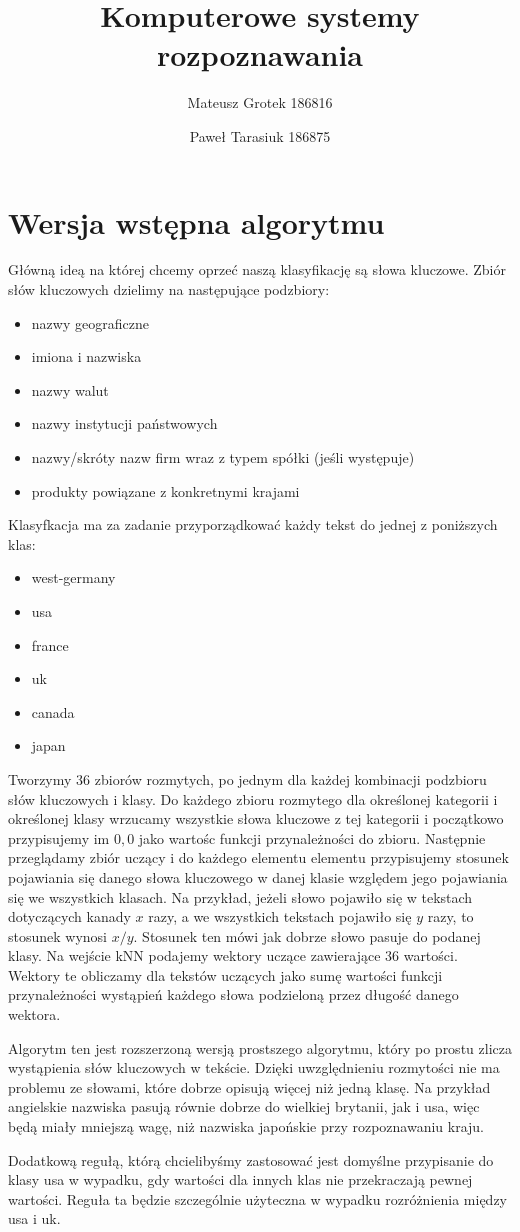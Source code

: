 \documentclass[a4paper]{article}
\title{Komputerowe systemy rozpoznawania}
\author{Mateusz Grotek 186816 \and Paweł Tarasiuk 186875}
\date{}
\begin{document}
\maketitle
\section{Wersja wstępna algorytmu}
Główną ideą na której chcemy oprzeć naszą klasyfikację są słowa kluczowe. Zbiór słów kluczowych dzielimy na następujące podzbiory:
\begin{itemize}
\item nazwy geograficzne
\item imiona i nazwiska
\item nazwy walut
\item nazwy instytucji państwowych
\item nazwy/skróty nazw firm wraz z typem spółki (jeśli występuje)
\item produkty powiązane z konkretnymi krajami
\end{itemize}
Klasyfkacja ma za zadanie przyporządkować każdy tekst do jednej z poniższych klas:
\begin{itemize}
\item west-germany
\item usa
\item france
\item uk
\item canada
\item japan
\end{itemize}
Tworzymy 36 zbiorów rozmytych, po jednym dla każdej kombinacji podzbioru słów kluczowych i klasy.
Do każdego zbioru rozmytego dla określonej kategorii i określonej klasy wrzucamy wszystkie słowa kluczowe z tej kategorii i początkowo przypisujemy im \(0{,}0\) jako wartośc
funkcji przynależności do zbioru. Następnie przeglądamy zbiór uczący i do każdego elementu elementu przypisujemy stosunek pojawiania się danego słowa kluczowego w danej klasie
względem jego pojawiania się we wszystkich klasach. Na przykład, jeżeli słowo pojawiło się w tekstach dotyczących kanady \(x\) razy, a we wszystkich tekstach pojawiło się \(y\) razy,
to stosunek wynosi \(x/y\). Stosunek ten mówi jak dobrze słowo pasuje do podanej klasy. Na wejście kNN podajemy wektory uczące zawierające 36 wartości. Wektory te obliczamy dla
tekstów uczących jako sumę wartości funkcji przynależności wystąpień każdego słowa podzieloną przez długość danego wektora.

Algorytm ten jest rozszerzoną wersją prostszego algorytmu, który po prostu zlicza wystąpienia słów kluczowych w tekście. Dzięki uwzględnieniu rozmytości nie ma problemu ze słowami,
które dobrze opisują więcej niż jedną klasę. Na przykład angielskie nazwiska pasują równie dobrze do wielkiej brytanii, jak i usa, więc będą miały mniejszą wagę,
niż nazwiska japońskie przy rozpoznawaniu kraju.

Dodatkową regułą, którą chcielibyśmy zastosować jest domyślne przypisanie do klasy usa w wypadku, gdy wartości dla innych klas nie przekraczają pewnej wartości. Reguła ta będzie
szczególnie użyteczna w wypadku rozróżnienia między usa i uk.
\end{document}
